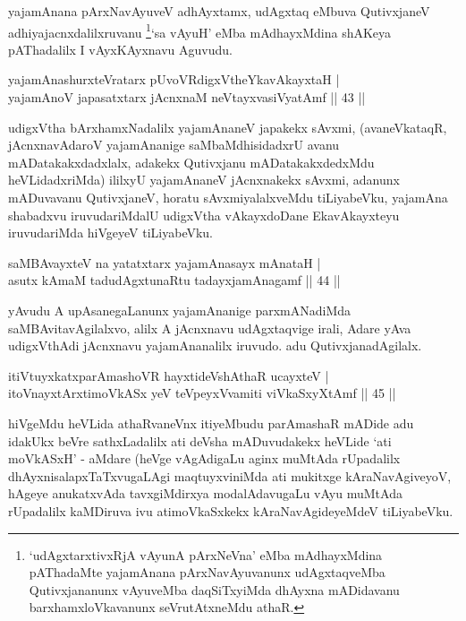 \begin{artha}
yajamAnana pArxNavAyuveV adhAyxtamx, udAgxtaq eMbuva QutivxjaneV adhiyajacnxdalilxruvanu \footnote[1]{`udAgxtarxtivxRjA vAyunA pArxNeVna' eMba mAdhayxMdina pAThadaMte yajamAnana pArxNavAyuvanunx udAgxtaqveMba Qutivxjananunx vAyuveMba daqSiTxyiMda dhAyxna mADidavanu barxhamxloVkavanunx seVrutAtxneMdu athaR.}`sa vAyuH' eMba mAdhayxMdina shAKeya pAThadalilx I vAyxKAyxnavu Aguvudu.
\end{artha}


\begin{shl}
yajamAnashurxteVratarx pUvoVRdigxVtheYkavAkayxtaH |\\
yajamAnoV japasatxtarx jAcnxnaM neVtayxvasiVyatAmf \hfill || 43 ||
\end{shl}

\begin{artha}
udigxVtha bArxhamxNadalilx yajamAnaneV japakekx sAvxmi, (avaneVkataqR, jAcnxnavAdaroV yajamAnanige saMbaMdhisidadxrU avanu mADatakakxdadxlalx, adakekx Qutivxjanu mADatakakxdedxMdu heVLidadxriMda) ililxyU yajamAnaneV jAcnxnakekx sAvxmi, adanunx mADuvavanu QutivxjaneV, horatu sAvxmiyalalxveMdu tiLiyabeVku, yajamAna shabadxvu iruvudariMdalU udigxVtha vAkayxdoDane EkavAkayxteyu iruvudariMda hiVgeyeV tiLiyabeVku.
\end{artha}

\begin{shl}
saMBAvayxteV na yatatxtarx yajamAnasayx mAnataH |\\
asutx kAmaM tadudAgxtunaRtu tadayxjamAnagamf \hfill || 44 ||
\end{shl}

\begin{artha}
yAvudu A upAsanegaLanunx yajamAnanige parxmANadiMda saMBAvitavAgilalxvo, alilx A jAcnxnavu udAgxtaqvige irali, Adare yAva udigxVthAdi jAcnxnavu yajamAnanalilx iruvudo. adu QutivxjanadAgilalx.
\end{artha}

\begin{shl}
itiVtuyxkatxparAmashoVR hayxtideVshAthaR ucayxteV |\\
itoV\s nayxtArxtimoVkASx yeV teV\s peyxVvamiti viVkaSxyXtAmf \hfill || 45 ||
\end{shl}

\begin{artha}
hiVgeMdu heVLida athaRvaneVnx itiyeMbudu parAmashaR mADide adu idakUkx beVre sathxLadalilx ati deVsha mADuvudakekx heVLide `ati moVkASxH' - aMdare (heVge vAgAdigaLu aginx muMtAda rUpadalilx dhAyxnisalapxTaTxvugaLAgi maqtuyxviniMda ati mukitxge kAraNavAgiveyoV, hAgeye anukatxvAda tavxgiMdirxya modalAdavugaLu vAyu muMtAda rUpadalilx kaMDiruva ivu atimoVkaSxkekx kAraNavAgideyeMdeV tiLiyabeVku.
\end{artha}

